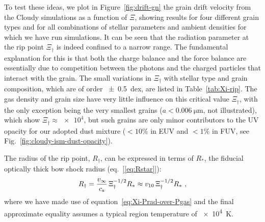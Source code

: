 To test these ideas, we plot in Figure~\ref{fig:drift-gn} the grain
drift velocity from the Cloudy simulations as a function of \(\Xi\),
showing results for four different grain types and for all
combinations of stellar parameters and ambient densities for which we
have run simulations.  It can be seen that the radiation parameter at
the rip point \(\Xi_\dagger\) is indeed confined to a narrow range.  The
fundamental explanation for this is that both the charge balance and
the force balance are essentially due to competition between the
photons and the charged particles that interact with the grain.  The
small variations in \(\Xi_\dag\) with stellar type and grain composition,
which are of order \SI{+- 0.5}{dex}, are listed in
Table~\ref{tab:Xi-rip}.  The gas density and grain size have very
little influence on this critical value \(\Xi_\dag\), with the only
exception being the very smallest grains (\(a < \SI{0.006}{\um}\), not
illustrated), which show \(\Xi_\dag \approx \num{e4}\), but such grains are only
minor contributors to the UV opacity for our adopted dust mixture
(\(< 10\%\) in EUV and \(< 1\%\) in FUV, see
Fig.~\ref{fig:cloudy-ism-dust-opacity}).


The radius of the rip point, \(R_\dag\), can be expressed in terms of
\(R_*\), the fiducial optically thick bow shock radius
(eq.~[\ref{eq:Rstar}]):
\begin{equation}
  \label{eq:Rdag-over-Rstar}
  R_\dag = \frac{v_\infty}{c_{\text{s}}}\, \Xi_\dag^{-1/2} R_* \approx v_{10}\, \Xi_\dag^{-1/2} R_* \ ,
\end{equation}
where we have made use of equation~\eqref{eq:Xi-Prad-over-Pgas} and
the final approximate equality assumes a typical \hii{} region
temperature of \SI{e4}{K}.

